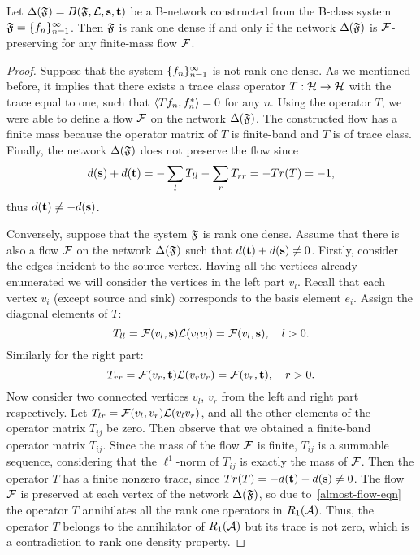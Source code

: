 \documentclass[12pt,oneside,a4paper]{amsart}
\begin{document}
      \begin{theorem}
        \label{thm-graph-eq}
          Let $\net(\fsys) = B(\fsys, \len, \source, \sink)$ be a B-network constructed
            from the B-class system $\fsys = \seq{f}$.
          Then $\fsys$ is rank one dense if and only if
            the network $\net(\fsys)$ is $\flow$-preserving for any finite-mass flow $\flow$.
      \end{theorem}
      \begin{proof}
        Suppose that the system $\seq{f}$ is not rank one dense.
        As we mentioned before, it implies that there exists a trace class operator $T: \cal{H} \to \cal{H}$ with
          the trace equal to one, such that $\inner{Tf_n}{f_n^*} = 0$ for any $n$.
        Using the operator $T$, we were able to define a flow $\flow$ on the network $\net(\fsys)$.
        The constructed flow has a finite mass because the operator matrix of $T$ is finite-band and $T$ is of trace class.
        Finally, the network $\net(\fsys)$ does not preserve the flow since
        \[
          d(\source) + d(\sink) = -\sum_{l} T_{ll} -\sum_{r} T_{rr} = -Tr(T) = -1,
        \]
        thus $d(\sink) \neq -d(\source)$.

        Conversely, suppose that the system $\fsys$ is rank one dense.
        Assume that there is also a flow $\flow$ on the network $\net(\fsys)$ such that $d(\sink) + d(\source) \neq 0$.
        Firstly, consider the edges incident to the source vertex.
        Having all the vertices already enumerated we will consider the vertices in the left part $v_{l}$.
        Recall that each vertex $v_i$ (except source and sink) corresponds to the basis element $e_i$.
        Assign the diagonal elements of $T$:
        \[
          T_{ll} = \flow(v_l, \source) \len(v_l v_l) = \flow(v_l, \source), \quad l > 0.
        \]
        Similarly for the right part:
        \[
          T_{rr} = \flow(v_r, \sink) \len(v_r v_r) = \flow(v_r, \sink), \quad r > 0.
        \]
        Now consider two connected vertices $v_l$, $v_r$ from the left and right part respectively.
        Let $T_{lr} = \flow(v_l, v_r) \len(v_l  v_r)$,
        and all the other elements of the operator matrix $T_{ij}$ be zero.
        Then observe that we obtained a finite-band operator matrix $T_{ij}$.
        Since the mass of the flow $\flow$ is finite, $T_{ij}$ is a summable sequence, considering that
          the $\ell^1$-norm of $T_{ij}$ is exactly the mass of $\flow$.
        Then the operator $T$ has a finite nonzero trace, since $Tr(T) = -d(\sink) - d(\source) \neq 0$.
        The flow $\flow$ is preserved at each vertex of the network $\net(\fsys)$, so due to~\eqref{almost-flow-eqn}
          the operator $T$ annihilates all the rank one operators in $R_1(\cal{A})$.
        Thus, the operator $T$ belongs to the annihilator of $R_1(\cal{A})$ but its trace is not zero,
          which is a contradiction to rank one density property.
      \end{proof}
\end{document}
